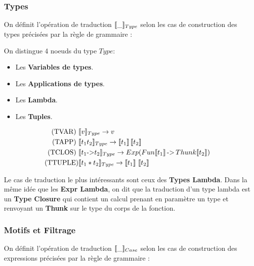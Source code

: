 \documentclass[12pt]{article}
\begin{document}
\subsubsection*{Types}\label{types-2}

On définit l'opération de traduction \(\llbracket \_ \rrbracket_{Type}\) selon les cas de construction
des types précisées par la règle de grammaire : 

On distingue 4 noeuds du type $Type$:
\begin{itemize}
      \tightlist
      \item
            Les \textbf{Variables de types}.
      \item
            Les \textbf{Applications de types}.
      \item
            Les \textbf{Lambda}.
      \item
            Les \textbf{Tuples}.
\end{itemize}
\begin{align*}
      \text{(TVAR) }  & \llbracket v \rrbracket_{Type} \rightarrow  v                                                                                          \\
      \text{(TAPP) }  & \llbracket t_1 t_2 \rrbracket_{Type} \rightarrow  \llbracket t_1 \rrbracket \, \llbracket t_2 \rrbracket                                       \\
      \text{(TCLOS) } & \llbracket t_1 \text{->} t_2 \rrbracket_{Type} \rightarrow  Exp (Fun\llbracket t_1 \rrbracket \, \text{->} \, Thunk\llbracket t_2 \rrbracket ) \\
      \text{(TTUPLE)} & \llbracket t_1 * t_2 \rrbracket_{Type} \rightarrow  \llbracket t_1 \rrbracket \,  \, \llbracket t_2 \rrbracket
\end{align*}

Le cas de traduction le plus intéressants sont ceux des \textbf{Types Lambda}.
Dans la même idée que les \textbf{Expr Lambda}, on dit que la traduction d'un type lambda est un \textbf{Type Closure} qui contient un calcul prenant en paramètre un type et renvoyant un \textbf{Thunk} sur le type du corps de la fonction.

\subsubsection*{Motifs et Filtrage}\label{motifs-et-filtrage}

On définit l'opération de traduction \(\llbracket \_ \rrbracket_{Case}\) selon les cas de construction
des expressions précisées par la règle de grammaire : 
\end{document}
